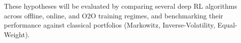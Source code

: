 \documentclass[10pt]{article}
\begin{document}
These hypotheses will be evaluated by comparing several deep RL algorithms across offline, online, and O2O training regimes, and benchmarking their performance against classical portfolios (Markowitz, Inverse-Volatility, Equal-Weight).




\end{document}
